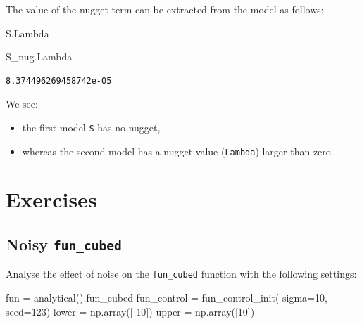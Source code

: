 \documentclass[
  letterpaper,
  DIV=11,
  numbers=noendperiod]{scrreprt}
\newenvironment{Shaded}{\begin{snugshade}}{\end{snugshade}}
\newcommand{\DecValTok}[1]{\textcolor[rgb]{0.68,0.00,0.00}{#1}}
\newcommand{\NormalTok}[1]{\textcolor[rgb]{0.00,0.23,0.31}{#1}}
\newcommand{\OperatorTok}[1]{\textcolor[rgb]{0.37,0.37,0.37}{#1}}
\providecommand{\tightlist}{%
  \setlength{\itemsep}{0pt}\setlength{\parskip}{0pt}}\usepackage{longtable,booktabs,array}
\begin{document}
The value of the nugget term can be extracted from the model as follows:

\begin{Shaded}
\begin{Highlighting}[]
\NormalTok{S.Lambda}
\end{Highlighting}
\end{Shaded}

\begin{Shaded}
\begin{Highlighting}[]
\NormalTok{S\_nug.Lambda}
\end{Highlighting}
\end{Shaded}

\begin{verbatim}
8.374496269458742e-05
\end{verbatim}

We see:

\begin{itemize}
\tightlist
\item
  the first model \texttt{S} has no nugget,
\item
  whereas the second model has a nugget value (\texttt{Lambda}) larger
  than zero.
\end{itemize}

\hypertarget{exercises-7}{%
\section{Exercises}\label{exercises-7}}

\hypertarget{noisy-fun_cubed-1}{%
\subsection{\texorpdfstring{Noisy
\texttt{fun\_cubed}}{Noisy fun\_cubed}}\label{noisy-fun_cubed-1}}

Analyse the effect of noise on the \texttt{fun\_cubed} function with the
following settings:

\begin{Shaded}
\begin{Highlighting}[]
\NormalTok{fun }\OperatorTok{=}\NormalTok{ analytical().fun\_cubed}
\NormalTok{fun\_control }\OperatorTok{=}\NormalTok{ fun\_control\_init(    }
\NormalTok{    sigma}\OperatorTok{=}\DecValTok{10}\NormalTok{,}
\NormalTok{    seed}\OperatorTok{=}\DecValTok{123}\NormalTok{)}
\NormalTok{lower }\OperatorTok{=}\NormalTok{ np.array([}\OperatorTok{{-}}\DecValTok{10}\NormalTok{])}
\NormalTok{upper }\OperatorTok{=}\NormalTok{ np.array([}\DecValTok{10}\NormalTok{])}
\end{Highlighting}
\end{Shaded}
\end{document}
